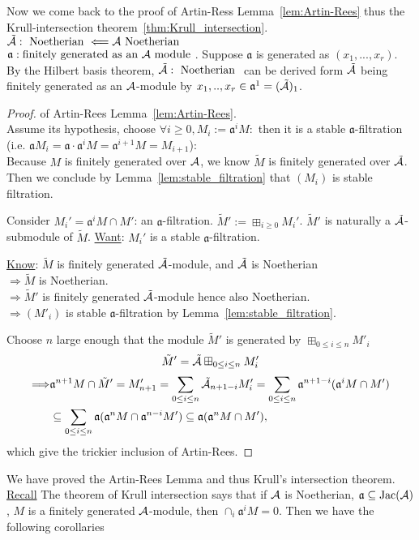 \documentclass[11pt]{article}
\newcommand{\sca}{{\mathfrak a}}
\newcommand{\cala}{{\cal A}}
\newcommand{\Lrta}{\Longrightarrow}
\newcommand{\Llta}{\Longleftarrow}
\begin{document}
Now we come back to the proof of Artin-Ress Lemma~\ref{lem:Artin-Rees} thus the Krull-intersection theorem~\ref{thm:Krull_intersection}.
$\tilde{\cala}:\text{ Noetherian }\Llta \cala \text{ Noetherian}$\\
$\sca: \text{finitely generated as an $\cala$ module }$. Suppose $\sca$ is generated as $(x_1,...,x_r)$. By the Hilbert basis theorem, $\tilde{\cala}:\text{ Noetherian }$ can be derived form $\tilde{\cala}$ being finitely generated as an $\cala$-module by $x_1,..,x_r\in\sca^1= (\tilde{\cala})_1$.

\begin{proof} of Artin-Rees Lemma~\ref{lem:Artin-Rees}.\\
Assume its hypothesis, choose $\forall i\geq 0, M_i:=\sca^i M:$ then it is a stable $\sca$-filtration (i.e. $\sca M_i=\sca\cdot \sca^i M=\sca^{i+1}M=M_{i+1}$):\\
 Because $M$ is finitely generated over $\cala$, we know $\tilde{M}$ is finitely generated over $\tilde{\cala}$. Then we conclude by Lemma~\ref{lem:stable_filtration} that $(M_i)$ is stable filtration.

Consider $M_i'=\sca^i M\cap M'$: an $\sca$-filtration. $\tilde{M}':=\boxplus_{i\geq 0}M_i'$. $\tilde{M}'$ is naturally a $\tilde{\cala}$-submodule of $\tilde{M}$. \underline{Want}: $M_i'$ is a stable $\sca$-filtration.

\underline{Know}:
$\tilde{M} $ is finitely generated $\tilde{\cala}$-module, and $\tilde{\cala}$ is Noetherian\\
$\Lrta \tilde{M}$ is Noetherian.\\
$\Lrta \tilde{M}'$ is finitely generated $\tilde{\cala}$-module hence also Noetherian.\\
$\Lrta (M'_i)$ is stable $\sca$-filtration by Lemma~\ref{lem:stable_filtration}. 


 Choose $n$ large enough that the module $\tilde{M}'$ is generated by $\boxplus_{0\leq i\leq n} M'_i$
 $$
 \tilde{M}'=\tilde{\cala}\boxplus_{0\leq i\leq n} M'_i
 $$
 $$
 \begin{aligned}
 \Lrta & \sca^{n+1}M\cap \tilde{M}'= M'_{n+1}=\sum_{0\leq i\leq n} \tilde{\cala}_{n+1-i}M'_i=\sum_{0\leq i\leq n}\sca^{n+1-i}(\sca^i M\cap M')\\
 &\subseteq\sum_{0\leq i\leq n}\sca(\sca^n M\cap \sca^{n-i}M')\subseteq \sca(\sca^n M\cap M'),
 \end{aligned}
 $$
which give the trickier inclusion of Artin-Rees.
\end{proof}
We have proved the Artin-Rees Lemma and thus Krull's intersection theorem.
\underline{Recall}
The theorem of Krull intersection says that if $\cala$ is Noetherian, $\sca\subseteq \text{Jac}(\cala)$, $M$ is a finitely generated $\cala$-module, then $\cap_i\sca^i M=0$. Then we have the following corollaries
\end{document}
